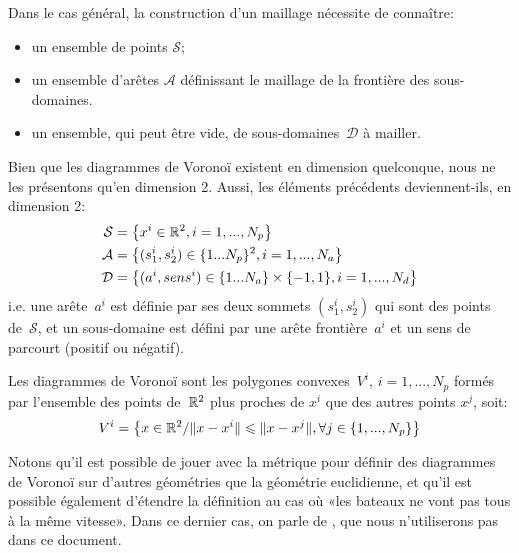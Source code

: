 Dans le cas général, la construction d'un maillage nécessite de connaître:
\begin{itemize}
   \item un ensemble de points $\mathcal{S}$;
   \item un ensemble d'arêtes $\mathcal{A}$ définissant le maillage de la frontière des sous-domaines.
   \item un ensemble, qui peut être vide, de sous-domaines~$\mathcal{D}$ à mailler.
\end{itemize}

Bien que les diagrammes de Voronoï existent en dimension quelconque, nous ne les présentons qu'en dimension 2.
Aussi, les éléments précédents deviennent-ils, en dimension 2:
\begin{align}
\mathcal{S} &= \left\{x^i\in\mathbb R^2, i=1, ..., N_p \right\}\\
\mathcal{A} &= \left\{(s_1^i,s_2^i)\in\{1...N_p\}^2, i=1, ..., N_a \right\}\\
\mathcal{D} &= \left\{(a^i,sens^i)\in\{1...N_a\}\times\{-1,1\}, i=1, ..., N_d \right\}
\end{align}
i.e. une arête~$a^i$ est définie par ses deux sommets $(s_1^i,s_2^i)$ qui sont des points de~$\mathcal{S}$, et un sous-domaine est défini par une arête frontière~$a^i$ et un sens de parcourt (positif ou négatif).

\begin{definition}
Les diagrammes de Voronoï sont les polygones convexes~$V^i$, $i=1, ..., N_p$ formés par l'ensemble des points de~$\mathbb R^2$ plus proches de $x^i$ que des autres points $x^j$, soit:
\begin{equation}
V^i=\left\{x\in\mathbb R^2/ \|x-x^i\|\leqslant\|x-x^j\|, \forall j\in\{1, ..., N_p\}\right\}
\end{equation}
\end{definition}
Notons qu'il est possible de jouer avec la métrique pour définir des diagrammes de Voronoï sur d'autres géométries que la géométrie euclidienne, et qu'il est possible également d'étendre la définition au cas où «les bateaux ne vont pas tous à la même vitesse». Dans ce dernier cas, on parle de , que nous n'utiliserons pas dans ce document.

